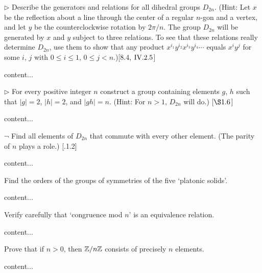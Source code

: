 \begin{exercise}
	$\triangleright$ Describe the generators and relations for all dihedral groups $D_{2n}$. (Hint: Let $x$ be the reflection about a line through the center of a regular $n$-gon and a vertex, and let $y$ be the counterclockwise rotation by $2\pi/n$. The group $D_{2n}$ will be generated by $x$ and $y$ subject to three relations. To see that these relations really determine $D_{2n}$, use them to show that any product $x^{i_1} y^{i_2}x^{i_3}y^{i_4}\cdots$ equals $x^iy^j$ for some $i$, $j$ with $0 \leq i \leq 1$, $0\leq j < n$.)[8.4, $\RNo{4}.2.5$]
\end{exercise}
\begin{solution}
	content...
\end{solution}

\begin{exercise}
	$\triangleright$ For every positive integer $n$ construct a group containing elements $g$, $h$ such that $|g| = 2$, $|h| = 2$, and $|gh|= n$. (Hint: For $n > 1$, $D_{2n}$ will do.) [$\S 1.6$] 
\end{exercise}
\begin{solution}
	content...
\end{solution}

\begin{exercise}
	$\neg$ Find all elements of $D_{2n}$ that commute with every other element. (The parity of $n$ plays a role.) [.1.2]
\end{exercise}
\begin{solution}
	content...
\end{solution}

\begin{exercise}
	Find the orders of the groups of symmetries of the five `platonic solids'.
\end{exercise}
\begin{solution}
	content...
\end{solution}

\begin{exercise}
	Verify carefully that `congruence mod $n$' is an equivalence relation.
\end{exercise}
\begin{solution}
	content...
\end{solution}

\begin{exercise}
	Prove that if $n>0$, then $\mathbb{Z}/n\mathbb{Z}$ consists of precisely $n$ elements.
\end{exercise}
\begin{solution}
	content...
\end{solution}

